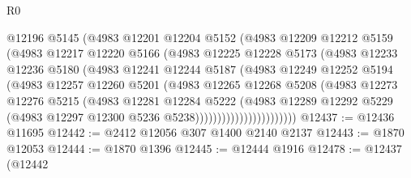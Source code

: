 \begin{lexlean}{R0}
\begin{coremodule}
                        @12196
                        @5145
                        (@4983
                          @12201
                          @12204
                          @5152
                          (@4983
                            @12209
                            @12212
                            @5159
                            (@4983
                              @12217
                              @12220
                              @5166
                              (@4983
                                @12225
                                @12228
                                @5173
                                (@4983
                                  @12233
                                  @12236
                                  @5180
                                  (@4983
                                    @12241
                                    @12244
                                    @5187
                                    (@4983
                                      @12249
                                      @12252
                                      @5194
                                      (@4983
                                        @12257
                                        @12260
                                        @5201
                                        (@4983
                                          @12265
                                          @12268
                                          @5208
                                          (@4983
                                            @12273
                                            @12276
                                            @5215
                                            (@4983
                                              @12281
                                              @12284
                                              @5222
                                              (@4983
                                                @12289
                                                @12292
                                                @5229
                                                (@4983
                                                  @12297
                                                  @12300
                                                  @5236
                                                  @5238)))))))))))))))))))))))
@12437 := @12436 @11695
@12442 := @2412 @12056 @307 @1400 @2140 @2137
@12443 := @1870 @12053
@12444 := @1870 @1396
@12445 := @12444 @1916
@12478 := @12437
    (@12442

\end{coremodule}
\end{lexlean}
